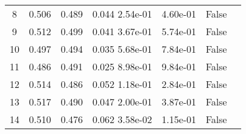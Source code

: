 \begin{tabular}{c|c|c|c|c|c|c}
  8 & 0.506 &   0.489 &   0.044   2.54e-01 &   4.60e-01 &  False\\
  9 & 0.512 &   0.499 &   0.041   3.67e-01 &   5.74e-01 &  False\\
 10 & 0.497 &   0.494 &   0.035   5.68e-01 &   7.84e-01 &  False\\
 11 & 0.486 &   0.491 &   0.025   8.98e-01 &   9.84e-01 &  False\\
 12 & 0.514 &   0.486 &   0.052   1.18e-01 &   2.84e-01 &  False\\
 13 & 0.517 &   0.490 &   0.047   2.00e-01 &   3.87e-01 &  False\\
 14 & 0.510 &   0.476 &   0.062   3.58e-02 &   1.15e-01 &  False\\
\end{tabular}